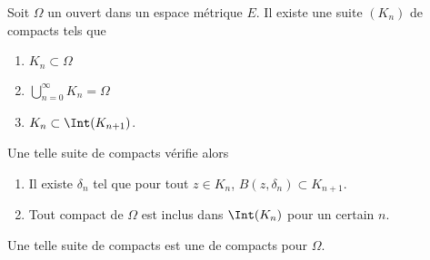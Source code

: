 \begin{lemmaDef}       \label{LemGDeZlOo}
	Soit \( \Omega\) un ouvert dans un espace métrique \( E\). Il existe une suite \( (K_n)\) de compacts tels que
	\begin{enumerate}
		\item
		      \( K_n\subset \Omega\)
		\item
		      \( \bigcup_{n=0}^{\infty}K_n=\Omega\)
		\item
		      \( K_n\subset\Int(K_{n+1})\).
	\end{enumerate}
	Une telle suite de compacts vérifie alors
	\begin{enumerate}
		\item
		      Il existe \( \delta_n\) tel que pour tout \( z\in K_n\), \( B(z,\delta_n)\subset K_{n+1}\).
		\item		\label{ITEMooBPYPooEMhSmY}
		      Tout compact de \( \Omega\) est inclus dans \( \Int(K_n)\) pour un certain \( n\).
	\end{enumerate}
	Une telle suite de compacts est une  de compacts pour \( \Omega\).
\end{lemmaDef}

